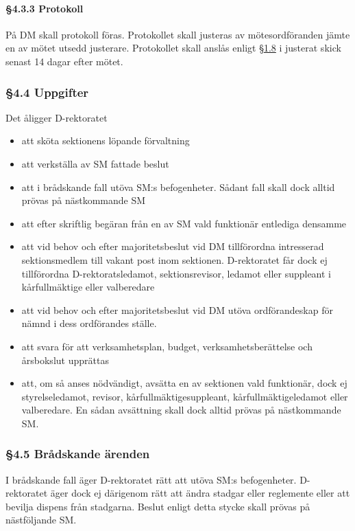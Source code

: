 \paragraph{§4.3.3 Protokoll}

På DM skall protokoll föras. Protokollet skall justeras av mötesordföranden jämte en av mötet utsedd justerare. Protokollet skall anslås enligt \href{#officiella_informationskanaler}{§1.8} i justerat skick senast 14 dagar efter mötet.

\subsubsection{§4.4 Uppgifter}

Det åligger D-rektoratet

\begin{itemize}
  \item att sköta sektionens löpande förvaltning
  \item att verkställa av SM fattade beslut
  \item att i brådskande fall utöva SM:s befogenheter. Sådant fall skall dock alltid prövas på nästkommande SM
  \item att efter skriftlig begäran från en av SM vald funktionär entlediga densamme
  \item att vid behov och efter majoritetsbeslut vid DM tillförordna intresserad sektionsmedlem till vakant post inom sektionen. D-rektoratet får dock ej tillförordna D-rektoratsledamot, sektionsrevisor, ledamot eller suppleant i kårfullmäktige eller valberedare
  \item att vid behov och efter majoritetsbeslut vid DM utöva ordförandeskap för nämnd i dess ordförandes ställe.
  \item att svara för att verksamhetsplan, budget, verksamhetsberättelse och årsbokslut upprättas
  \item att, om så anses nödvändigt, avsätta en av sektionen vald funktionär, dock ej styrelseledamot, revisor, kårfullmäktigesuppleant, kårfullmäktigeledamot eller valberedare. En sådan avsättning skall dock alltid prövas på nästkommande SM.
\end{itemize}

\subsubsection{§4.5 Brådskande ärenden}

I brådskande fall äger D-rektoratet rätt att utöva SM:s befogenheter. D-rektoratet äger dock ej därigenom rätt att ändra stadgar eller reglemente eller att bevilja dispens från stadgarna. Beslut enligt detta stycke skall prövas på nästföljande SM.

